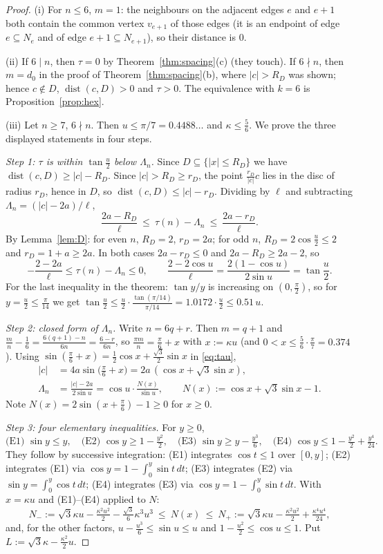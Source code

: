 \documentclass[11pt,a4paper]{article}
\theoremstyle{definition}
\theoremstyle{remark}
\DeclareMathOperator{\dist}{dist}
\begin{document}
\begin{proof}
(i) For $n\le6$, $m=1$: the neighbours on the adjacent edges $e$ and $e+1$ both contain the common vertex $v_{e+1}$ of those edges (it is an endpoint of edge $e\subseteq N_e$ and of edge $e+1\subseteq N_{e+1}$), so their distance is $0$.

(ii) If $6\mid n$, then $\tau=0$ by Theorem~\ref{thm:spacing}(c) (they touch). If $6\nmid n$, then $m=d_0$ in the proof of Theorem~\ref{thm:spacing}(b), where $|c|>R_D$ was shown; hence $c\notin D$, $\dist(c,D)>0$ and $\tau>0$. The equivalence with $k=6$ is Proposition~\ref{prop:hex}.

(iii) Let $n\ge7$, $6\nmid n$. Then $u\le\pi/7=0.4488\ldots$ and $\kappa\le\frac56$. We prove the three displayed statements in four steps.

\emph{Step 1: $\tau$ is within $\tan\frac u2$ below $\Lambda_n$.}
Since $D\subseteq\{|x|\le R_D\}$ we have $\dist(c,D)\ge|c|-R_D$. Since $|c|>R_D\ge r_D$, the point $\frac{r_D}{|c|}c$ lies in the disc of radius $r_D$, hence in $D$, so $\dist(c,D)\le|c|-r_D$. Dividing by $\ell$ and subtracting $\Lambda_n=(|c|-2a)/\ell$,
\[
\frac{2a-R_D}{\ell}\ \le\ \tau(n)-\Lambda_n\ \le\ \frac{2a-r_D}{\ell}.
\]
By Lemma~\ref{lem:D}: for even $n$, $R_D=2$, $r_D=2a$; for odd $n$, $R_D=2\cos\frac u2\le2$ and $r_D=1+a\ge2a$. In both cases $2a-r_D\le0$ and $2a-R_D\ge2a-2$, so
\[
-\frac{2-2a}{\ell}\le\tau(n)-\Lambda_n\le0,\qquad\frac{2-2\cos u}{\ell}=\frac{2(1-\cos u)}{2\sin u}=\tan\frac u2 .
\]
For the last inequality in the theorem: $\tan y/y$ is increasing on $(0,\frac\pi2)$, so for $y=\frac u2\le\frac\pi{14}$ we get $\tan\frac u2\le\frac u2\cdot\frac{\tan(\pi/14)}{\pi/14}=1.0172\cdot\frac u2\le0.51\,u$.

\emph{Step 2: closed form of $\Lambda_n$.} Write $n=6q+r$. Then $m=q+1$ and $\frac{m}{n}-\frac16=\frac{6(q+1)-n}{6n}=\frac{6-r}{6n}$, so $\frac{\pi m}{n}=\frac\pi6+x$ with $x:=\kappa u$ (and $0<x\le\frac56\cdot\frac\pi7=0.374$). Using $\sin(\frac\pi6+x)=\frac12\cos x+\frac{\sqrt3}2\sin x$ in \eqref{eq:tau},
\[
\begin{aligned}
|c|&=4a\sin\big(\tfrac\pi6+x\big)=2a\,(\cos x+\sqrt3\sin x),\\
\Lambda_n&=\frac{|c|-2a}{2\sin u}=\cos u\cdot\frac{N(x)}{\sin u},\qquad N(x):=\cos x+\sqrt3\sin x-1 .
\end{aligned}
\]
Note $N(x)=2\sin(x+\frac\pi6)-1\ge0$ for $x\ge0$.

\emph{Step 3: four elementary inequalities.} For $y\ge0$,
\[
\text{(E1) }\sin y\le y,\quad\text{(E2) }\cos y\ge1-\tfrac{y^2}2,\quad\text{(E3) }\sin y\ge y-\tfrac{y^3}6,\quad\text{(E4) }\cos y\le1-\tfrac{y^2}2+\tfrac{y^4}{24}.
\]
They follow by successive integration: (E1) integrates $\cos t\le1$ over $[0,y]$; (E2) integrates (E1) via $\cos y=1-\int_0^y\sin t\,dt$; (E3) integrates (E2) via $\sin y=\int_0^y\cos t\,dt$; (E4) integrates (E3) via $\cos y=1-\int_0^y\sin t\,dt$.
With $x=\kappa u$ and (E1)--(E4) applied to $N$:
\[
N_-:=\sqrt3\kappa u-\tfrac{\kappa^2u^2}{2}-\tfrac{\sqrt3}{6}\kappa^3u^3\ \le\ N(x)\ \le\ N_+:=\sqrt3\kappa u-\tfrac{\kappa^2u^2}{2}+\tfrac{\kappa^4u^4}{24},
\]
and, for the other factors, $u-\frac{u^3}6\le\sin u\le u$ and $1-\frac{u^2}2\le\cos u\le1$.
Put $L:=\sqrt3\kappa-\frac{\kappa^2}{2}u$.


\end{proof}
\end{document}
